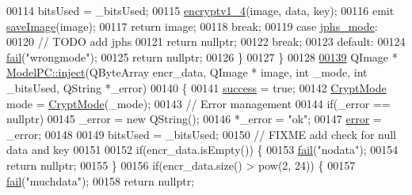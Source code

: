 \begin{DoxyCode}
00114             bitsUsed = \_bitsUsed;
00115             \hyperlink{class_model_p_c_a4daefc3fb87a1f19172b9b20c987eb12}{encryptv1\_4}(image, data, key);
00116             emit \hyperlink{class_model_p_c_a41f5e2e8022679046e4d3fa1109025fa}{saveImage}(image);
00117             \textcolor{keywordflow}{return} image;
00118         \textcolor{keywordflow}{break};
00119         \textcolor{keywordflow}{case} \hyperlink{class_model_p_c_a296dd7afe3e1c49b3da25fd644fe4ceba90ca32d3ccbb6be224cdfc33f7096eea}{jphs\_mode}:
00120             \textcolor{comment}{// TODO add jphs}
00121             \textcolor{keywordflow}{return} \textcolor{keyword}{nullptr};
00122         \textcolor{keywordflow}{break};
00123         \textcolor{keywordflow}{default}:
00124             \hyperlink{class_model_p_c_a47464b59b7e37fcee25e55475708aabd}{fail}(\textcolor{stringliteral}{"wrongmode"});
00125             \textcolor{keywordflow}{return} \textcolor{keyword}{nullptr};
00126     \}
00127 \}
00128 
\hypertarget{modelpc_8cpp_source_l00139}{}\hyperlink{class_model_p_c_aada6a04d81ada8f2b4ba18108c8d6f10}{00139} QImage * \hyperlink{class_model_p_c_aada6a04d81ada8f2b4ba18108c8d6f10}{ModelPC::inject}(QByteArray encr\_data, QImage * image, \textcolor{keywordtype}{int} \_mode, \textcolor{keywordtype}{int} \_bitsUsed, 
      QString *\_error)
00140 \{
00141     \hyperlink{class_model_p_c_a945ffbbc44a832b953c191debd448f4c}{success} = \textcolor{keyword}{true};
00142     \hyperlink{class_model_p_c_a296dd7afe3e1c49b3da25fd644fe4ceb}{CryptMode} mode = \hyperlink{class_model_p_c_a296dd7afe3e1c49b3da25fd644fe4ceb}{CryptMode}(\_mode);
00143     \textcolor{comment}{// Error management}
00144     \textcolor{keywordflow}{if}(\_error == \textcolor{keyword}{nullptr})
00145         \_error = \textcolor{keyword}{new} QString();
00146     *\_error = \textcolor{stringliteral}{"ok"};
00147     \hyperlink{class_model_p_c_a4e5a9c0ca1f06fe5bc478b6bf248c37c}{error} = \_error;
00148 
00149     bitsUsed = \_bitsUsed;
00150     \textcolor{comment}{// FIXME add check for null data and key}
00151 
00152     \textcolor{keywordflow}{if}(encr\_data.isEmpty()) \{
00153         \hyperlink{class_model_p_c_a47464b59b7e37fcee25e55475708aabd}{fail}(\textcolor{stringliteral}{"nodata"});
00154         \textcolor{keywordflow}{return} \textcolor{keyword}{nullptr};
00155     \}
00156     \textcolor{keywordflow}{if}(encr\_data.size() > pow(2, 24)) \{
00157         \hyperlink{class_model_p_c_a47464b59b7e37fcee25e55475708aabd}{fail}(\textcolor{stringliteral}{"muchdata"});
00158         \textcolor{keywordflow}{return} \textcolor{keyword}{nullptr};

\end{DoxyCode}
